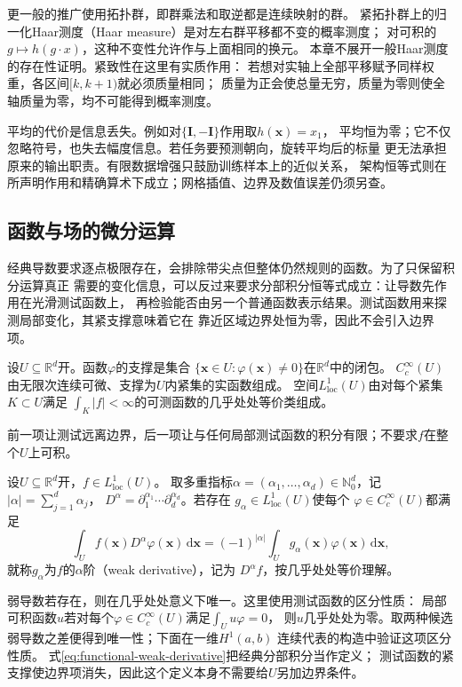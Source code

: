 更一般的推广使用拓扑群，即群乘法和取逆都是连续映射的群。
紧拓扑群上的归一化Haar测度（Haar measure）是对左右群平移都不变的概率测度；
对可积的$g\mapsto h(g\cdot x)$，这种不变性允许作与上面相同的换元。
本章不展开一般Haar测度的存在性证明。紧致性在这里有实质作用：
若想对实轴上全部平移赋予同样权重，各区间$[k,k+1)$就必须质量相同；
质量为正会使总量无穷，质量为零则使全轴质量为零，均不可能得到概率测度。

平均的代价是信息丢失。例如对$\{\bm I,-\bm I\}$作用取$h(\bm x)=x_1$，
平均恒为零；它不仅忽略符号，也失去幅度信息。若任务要预测朝向，旋转平均后的标量
更无法承担原来的输出职责。有限数据增强只鼓励训练样本上的近似关系，
架构恒等式则在所声明作用和精确算术下成立；网格插值、边界及数值误差仍须另查。

\subsection{函数与场的微分运算}
\label{sec:functional-spatial-differentiation}
\label{sec:geometry-smoothness-geometric-operators}


经典导数要求逐点极限存在，会排除带尖点但整体仍然规则的函数。为了只保留积分运算真正
需要的变化信息，可以反过来要求分部积分恒等式成立：让导数先作用在光滑测试函数上，
再检验能否由另一个普通函数表示结果。测试函数用来探测局部变化，其紧支撑意味着它在
靠近区域边界处恒为零，因此不会引入边界项。
\begin{definition}[测试函数与局部可积性]
\label{def:functional-tests-local-integrability}
设$U\subseteq\mathbb R^d$开。函数$\varphi$的支撑是集合
$\{\bm x\in U:\varphi(\bm x)\neq0\}$在$\mathbb R^d$中的闭包。
$C_c^\infty(U)$由无限次连续可微、支撑为$U$内紧集的实函数组成。
空间$L^1_{\mathrm{loc}}(U)$由对每个紧集$K\subset U$满足
$\int_K|f|<\infty$的可测函数的几乎处处等价类组成。
\end{definition}
前一项让测试远离边界，后一项让与任何局部测试函数的积分有限；不要求$f$在整个$U$上可积。
\begin{definition}[弱导数]
\label{def:functional-weak-derivative}
设$U\subseteq\mathbb R^d$开，$f\in L^1_{\mathrm{loc}}(U)$。
取多重指标$\alpha=(\alpha_1,\ldots,\alpha_d)\in\mathbb{N}_0^d$，记
$|\alpha|=\sum_{j=1}^d\alpha_j$，
$D^\alpha=\partial_1^{\alpha_1}\cdots\partial_d^{\alpha_d}$。若存在
$g_\alpha\in L^1_{\mathrm{loc}}(U)$使每个
$\varphi\in C_c^\infty(U)$都满足
\begin{equation}
  \int_U f(\bm{x})D^\alpha\varphi(\bm{x})\,\mathrm{d}\bm{x}
  =
  (-1)^{|\alpha|}
  \int_U g_\alpha(\bm{x})\varphi(\bm{x})\,\mathrm{d}\bm{x},
  \label{eq:functional-weak-derivative}
\end{equation}
就称$g_\alpha$为$f$的$\alpha$阶（weak derivative），记为
$D^\alpha f$，按几乎处处等价理解。
\end{definition}
弱导数若存在，则在几乎处处意义下唯一。这里使用测试函数的区分性质：
局部可积函数$u$若对每个$\varphi\in C_c^\infty(U)$满足$\int_Uu\varphi=0$，
则$u$几乎处处为零。取两种候选弱导数之差便得到唯一性；下面在一维$H^1(a,b)$
连续代表的构造中验证这项区分性质。
式\eqref{eq:functional-weak-derivative}把经典分部积分当作定义；
测试函数的紧支撑使边界项消失，因此这个定义本身不需要给$U$另加边界条件。

